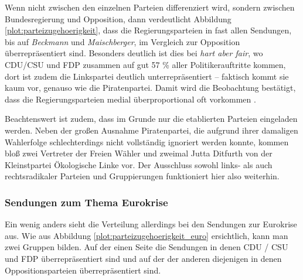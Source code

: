 Wenn nicht zwischen den einzelnen Parteien differenziert wird, sondern zwischen Bundesregierung und Opposition, dann verdeutlicht Abbildung \vref{plot:parteizugehoerigkeit}, dass die Regierungsparteien in fast allen Sendungen, bis auf \textit{Beckmann} und \textit{Maischberger}, im Vergleich zur Opposition überrepräsentiert sind. Besonders deutlich ist dies bei \textit{hart aber fair}, wo CDU/CSU und FDP zusammen auf gut 57 \% aller Politikerauftritte kommen, dort ist zudem die Linkspartei deutlich unterrepräsentiert – faktisch kommt sie kaum vor, genauso wie die Piratenpartei. Damit wird die Beobachtung bestätigt, dass die Regierungsparteien medial überproportional oft vorkommen \parencites{amendtSchwarzgelberKanalDeutsche2012}[144]{hoffmannPolitischeFernsehinterviewsEmpirische1982}.

Beachtenswert ist zudem, dass im Grunde nur die etablierten Parteien eingeladen werden. Neben der großen Ausnahme Piratenpartei, die aufgrund ihrer damaligen Wahlerfolge schlechterdings nicht vollständig ignoriert werden konnte, kommen bloß zwei Vertreter der Freien Wähler und zweimal Jutta Ditfurth von der Kleinstpartei Ökologische Linke vor. Der Ausschluss sowohl links- als auch rechtsradikaler Parteien und Gruppierungen funktioniert hier also weiterhin.

\subsubsection{Sendungen zum Thema Eurokrise}

Ein wenig anders sieht die Verteilung allerdings bei den Sendungen zur Eurokrise aus. Wie aus Abbildung \vref{plot:parteizugehoerigkeit_euro} ersichtlich, kann man zwei Gruppen bilden. Auf der einen Seite die Sendungen in denen CDU / CSU und FDP überrepräsentiert sind und auf der der anderen diejenigen in denen Oppositionsparteien überrepräsentiert sind.

